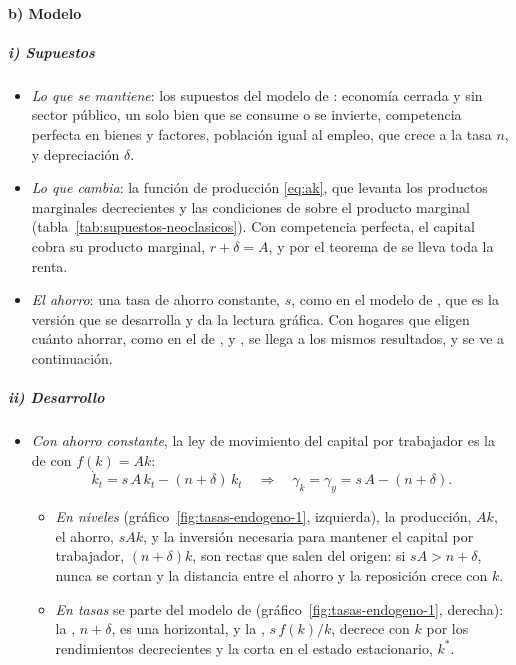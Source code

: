 \documentclass[11pt]{article}
\begin{document}
\paragraph{b) Modelo}

\subparagraph{i) Supuestos}

\begin{itemize}
\item \emph{Lo que se mantiene}: los supuestos del modelo de  : economía cerrada y sin sector público, un solo bien que se consume o se invierte, competencia perfecta en bienes y factores, población igual al empleo, que crece a la tasa $n$, y depreciación $\delta$.
\item \emph{Lo que cambia}: la función de producción \eqref{eq:ak}, que levanta los productos marginales decrecientes y las condiciones de  sobre el producto marginal (tabla~\ref{tab:supuestos-neoclasicos}). Con competencia perfecta, el capital cobra su producto marginal, $r+\delta=A$, y por el teorema de  se lleva toda la renta.
\item \emph{El ahorro}: una tasa de ahorro constante, $s$, como en el modelo de , que es la versión que se desarrolla y da la lectura gráfica. Con hogares que eligen cuánto ahorrar, como en el de ,  y , se llega a los mismos resultados, y se ve a continuación.
\end{itemize}

\subparagraph{ii) Desarrollo}

\begin{itemize}
\item \emph{Con ahorro constante}, la ley de movimiento del capital por trabajador es la de  con $f(k)=Ak$:
  \begin{equation}
  \dot k_t=s\,A\,k_t-(n+\delta)\,k_t\quad\Longrightarrow\quad \gamma_k=\gamma_y=s\,A-(n+\delta).\label{eq:ak-solow}
  \end{equation}
  \begin{itemize}
  \item \emph{En niveles} (gráfico~\ref{fig:tasas-endogeno-1}, izquierda), la producción, $Ak$, el ahorro, $sAk$, y la inversión necesaria para mantener el capital por trabajador, $(n+\delta)k$, son rectas que salen del origen: si $sA>n+\delta$, nunca se cortan y la distancia entre el ahorro y la reposición crece con $k$.
  \item \emph{En tasas} se parte del modelo de  (gráfico~\ref{fig:tasas-endogeno-1}, derecha): la , $n+\delta$, es una horizontal, y la , $s\,f(k)/k$, decrece con $k$ por los rendimientos decrecientes y la corta en el estado estacionario, $k^*$.
  \end{itemize}
\end{itemize}
\end{document}
